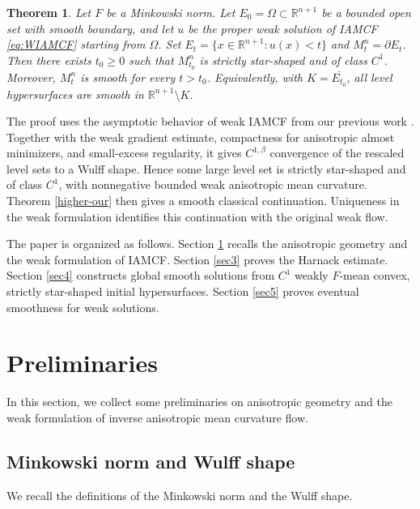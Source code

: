 \documentclass[11pt,reqno]{amsart}
\newtheorem{theorem}[proposition]{Theorem}
\theoremstyle{definition}
\theoremstyle{remark}
\numberwithin{equation}{section}
\begin{document}
	\begin{theorem}
		\label{thm-main}
		Let $F$ be a Minkowski norm. Let $E_0=\Omega\subset\mathbb{R}^{n+1}$ be a bounded open set with smooth boundary, and let $u$ be the proper weak solution of IAMCF \eqref{eq:WIAMCF} starting from $\Omega$. Set $E_t=\{x\in\mathbb{R}^{n+1}:u(x)<t\}$ and $M_t^n=\partial E_t$. Then there exists $t_0\geq 0$ such that $M_{t_0}^n$ is strictly star-shaped and of class $C^1$. Moreover, $M_t^n$ is smooth for every $t>t_0$. Equivalently, with $K=\overline{E_{t_0}}$, all level hypersurfaces are smooth in $\mathbb{R}^{n+1}\setminus K$.
	\end{theorem}
	
	The proof uses the asymptotic behavior of weak IAMCF from our previous work \cite{GWZ26}. Together with the weak gradient estimate, compactness for anisotropic almost minimizers, and small-excess regularity, it gives $C^{1,\beta}$ convergence of the rescaled level sets to a Wulff shape. Hence some large level set is strictly star-shaped and of class $C^1$, with nonnegative bounded weak anisotropic mean curvature. Theorem \ref{higher-our} then gives a smooth classical continuation. Uniqueness in the weak formulation identifies this continuation with the original weak flow.

   The paper is organized as follows. Section \ref{sec2} recalls the anisotropic geometry and the weak formulation of IAMCF. Section \ref{sec3} proves the Harnack estimate. Section \ref{sec4} constructs global smooth solutions from $C^1$ weakly $F$-mean convex, strictly star-shaped initial hypersurfaces. Section \ref{sec5} proves eventual smoothness for weak solutions.


\section{Preliminaries}
	\label{sec2}
	In this section, we collect some preliminaries on anisotropic geometry and the weak formulation of inverse anisotropic mean curvature flow.
	
	\subsection{Minkowski norm and Wulff shape}\label{sec.2-1}
	We recall the definitions of the Minkowski norm and the Wulff shape.
	
\end{document}
